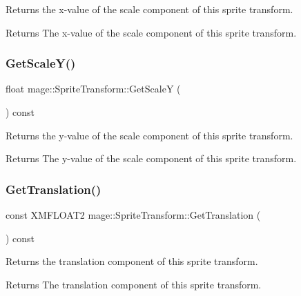 Returns the x-\/value of the scale component of this sprite transform.

\begin{DoxyReturn}{Returns}
The x-\/value of the scale component of this sprite transform. 
\end{DoxyReturn}
\hypertarget{structmage_1_1_sprite_transform_ad25f6881510e258a5afb00ae9ad7bc87}{}\label{structmage_1_1_sprite_transform_ad25f6881510e258a5afb00ae9ad7bc87} 
\subsubsection{\texorpdfstring{Get\+Scale\+Y()}{GetScaleY()}}
{\footnotesize\ttfamily float mage\+::\+Sprite\+Transform\+::\+Get\+ScaleY (\begin{DoxyParamCaption}{ }\end{DoxyParamCaption}) const}

Returns the y-\/value of the scale component of this sprite transform.

\begin{DoxyReturn}{Returns}
The y-\/value of the scale component of this sprite transform. 
\end{DoxyReturn}
\hypertarget{structmage_1_1_sprite_transform_acc7d00e636101c9c9b882f60ddcb93d5}{}\label{structmage_1_1_sprite_transform_acc7d00e636101c9c9b882f60ddcb93d5} 
\subsubsection{\texorpdfstring{Get\+Translation()}{GetTranslation()}}
{\footnotesize\ttfamily const X\+M\+F\+L\+O\+A\+T2 mage\+::\+Sprite\+Transform\+::\+Get\+Translation (\begin{DoxyParamCaption}{ }\end{DoxyParamCaption}) const}

Returns the translation component of this sprite transform.

\begin{DoxyReturn}{Returns}
The translation component of this sprite transform. 
\end{DoxyReturn}
\hypertarget{structmage_1_1_sprite_transform_ab33e1ff3c03940072538fe4a6b746f10}{}\label{structmage_1_1_sprite_transform_ab33e1ff3c03940072538fe4a6b746f10} 
